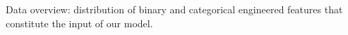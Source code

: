 Data overview: distribution of binary and categorical engineered features that constitute the input of our model.
\label{fig:EngineeredFeatures}